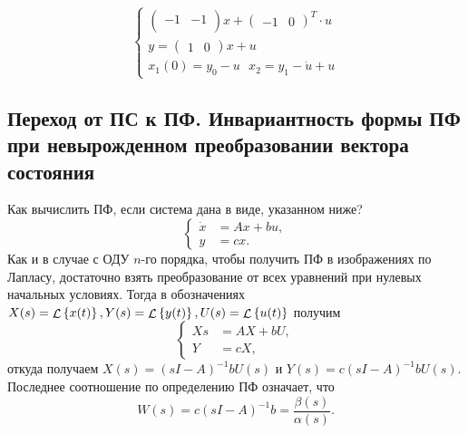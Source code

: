 \documentclass[../../TAU.tex]{subfiles}
\begin{document}
{$$\begin{cases}
\begin{pmatrix}
                    -1 & -1 \\
                \end{pmatrix}
                x+
                \begin{pmatrix}
                    -1 & 0
                \end{pmatrix}^T
                \cdot u          \\
                y = 
                \begin{pmatrix}
                    1 & 0
                \end{pmatrix}
                x + u            \\
                x_1(0)=y_0-u\ \ \ x_2=y_1-\dot u+u
            \end{cases}        
        $$
    }

\subsection{Переход от ПС к ПФ. Инвариантность формы 
ПФ при невырожденном преобразовании вектора состояния}

    Как вычислить ПФ, если система дана в виде, указанном ниже?
    $$
        \left\{
        \begin{aligned}
            \dot x &= Ax+bu,\\
            y&= cx.
        \end{aligned}
        \right.
    $$
    Как и в случае с ОДУ $n$-го порядка, чтобы получить ПФ в изображениях по Лапласу, достаточно взять преобразование от всех уравнений при нулевых начальных условиях. Тогда в обозначениях 
    $X(s)=\mathop{\mathcal{L}}\nolimits\left\{x(t)\right\}, Y(s)=\mathop{\mathcal{L}}\nolimits\left\{y(t)\right\}, U(s) = \mathop{\mathcal{L}}\nolimits\left\{u(t)\right\}$ 
    получим
    $$
        \left\{
        \begin{aligned}
            Xs &= AX+bU,\\
            Y &= cX,
        \end{aligned}
        \right.
    $$
    откуда получаем 
    $X(s) = (sI-A)^{-1}b U(s)$ 
    и 
    $Y(s) = c(sI-A)^{-1}b U(s)$. 
    Последнее соотношение по определению ПФ означает, что
    $$
        W(s) = c (sI-A)^{-1}b = \frac{\beta(s)}{\alpha(s)}.
    $$
\end{document}
